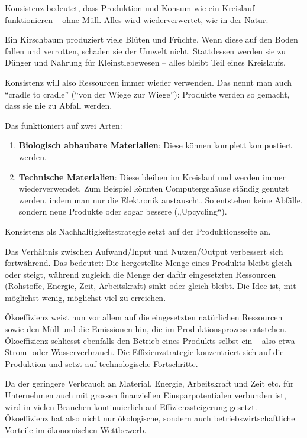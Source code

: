 \begin{myexercise}
\begin{textBox}[title = Konsistenz -- anders herstellen und
nutzen \cite{konsistenz}]
Konsistenz bedeutet, dass Produktion und Konsum wie ein Kreislauf funktionieren – ohne Müll. Alles wird wiederverwertet, wie in der Natur. 

Ein Kirschbaum produziert viele Blüten und Früchte. Wenn diese auf den Boden fallen und verrotten, schaden sie der Umwelt nicht. Stattdessen werden sie zu Dünger und Nahrung
für Kleinstlebewesen – alles bleibt Teil eines Kreislaufs.

Konsistenz will also Ressourcen immer wieder verwenden. Das nennt man auch \enquote{cradle to cradle} (\enquote{von der Wiege zur Wiege}): Produkte werden so gemacht, dass sie nie zu Abfall werden.

Das funktioniert auf zwei Arten:

\begin{enumerate}
\item \textbf{Biologisch abbaubare Materialien}: Diese können komplett kompostiert werden.

\item \textbf{Technische Materialien}: Diese bleiben im Kreislauf und werden immer wiederverwendet. Zum Beispiel könnten Computergehäuse ständig genutzt werden, indem man nur die Elektronik austauscht. So entstehen keine Abfälle, sondern neue Produkte oder sogar bessere („Upcycling“).
\end{enumerate}
Konsistenz als Nachhaltigkeitsstrategie setzt auf der Produktionsseite an.
\end{textBox}

\begin{textBox}[title = Effizienz -- besser produzieren mit weniger Ressourcenverbrauch und CO$_2$-Ausstoss \cite{effizienz}]


Das Verhältnis zwischen Aufwand/Input und Nutzen/Output verbessert sich fortwährend. Das bedeutet: Die hergestellte Menge eines Produkts bleibt gleich oder steigt, während zugleich die Menge der dafür eingesetzten Ressourcen (Rohstoffe, Energie, Zeit, Arbeitskraft) sinkt oder gleich bleibt. Die Idee ist, mit möglichst wenig, möglichst viel zu erreichen.

Ökoeffizienz weist nun vor allem auf die eingesetzten natürlichen Ressourcen sowie den Müll und die Emissionen hin, die im Produktionsprozess entstehen. Ökoeffizienz schliesst ebenfalls den Betrieb eines Produkts selbst ein – also etwa Strom- oder Wasserverbrauch. Die Effizienzstrategie konzentriert sich auf die Produktion und setzt auf technologische Fortschritte.

Da der geringere Verbrauch an Material, Energie, Arbeitskraft und Zeit etc. für Unternehmen auch mit grossen finanziellen Einsparpotentialen verbunden ist, wird in vielen Branchen kontinuierlich auf Effizienzsteigerung gesetzt. Ökoeffizienz hat also nicht nur ökologische, sondern auch betriebswirtschaftliche Vorteile im ökonomischen Wettbewerb.
\end{textBox}


\end{myexercise}
